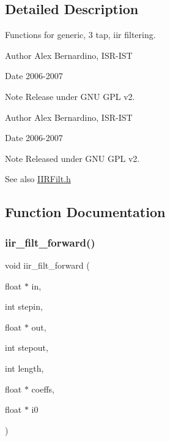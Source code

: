 \subsection{Detailed Description}
Functions for generic, 3 tap, iir filtering. 

\begin{DoxyAuthor}{Author}
Alex Bernardino, I\+S\+R-\/\+I\+ST 
\end{DoxyAuthor}
\begin{DoxyDate}{Date}
2006-\/2007 
\end{DoxyDate}
\begin{DoxyNote}{Note}
Release under G\+NU G\+PL v2.
\end{DoxyNote}
\begin{DoxyAuthor}{Author}
Alex Bernardino, I\+S\+R-\/\+I\+ST 
\end{DoxyAuthor}
\begin{DoxyDate}{Date}
2006-\/2007 
\end{DoxyDate}
\begin{DoxyNote}{Note}
Released under G\+NU G\+PL v2. 
\end{DoxyNote}
\begin{DoxySeeAlso}{See also}
\hyperlink{IIRFilt_8h}{I\+I\+R\+Filt.\+h} 
\end{DoxySeeAlso}


\subsection{Function Documentation}
\mbox{\label{IIRFilt_8h_a43b5832facfac4984b38e11e2fa80b48}} 
\subsubsection{\texorpdfstring{iir\+\_\+filt\+\_\+forward()}{iir\_filt\_forward()}}
{\footnotesize\ttfamily void iir\+\_\+filt\+\_\+forward (\begin{DoxyParamCaption}\item[{float $\ast$}]{in,  }\item[{int}]{stepin,  }\item[{float $\ast$}]{out,  }\item[{int}]{stepout,  }\item[{int}]{length,  }\item[{float $\ast$}]{coeffs,  }\item[{float $\ast$}]{i0 }\end{DoxyParamCaption})}




